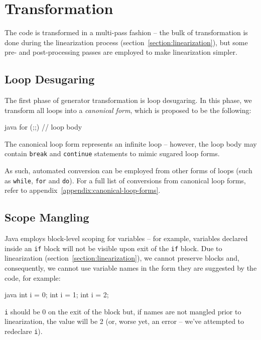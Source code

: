 \documentclass[journal,a4paper]{IEEEtran}
\begin{document}
\section{Transformation}

The code is transformed in a multi-pass fashion -- the bulk of transformation is done during the
linearization process (section~\ref{section:linearization}), but some pre- and post-processing
passes are employed to make linearization simpler.

\subsection{Loop Desugaring}

The first phase of generator transformation is loop desugaring. In this phase, we transform all
loops into a \emph{canonical form}, which is proposed to be the following:

\begin{pygmented}{java}
for (;;) {
    // loop body
}
\end{pygmented}

The canonical loop form represents an infinite loop -- however, the loop body may contain
\texttt{break} and \texttt{continue} statements to mimic sugared loop forms.

As such, automated conversion can be employed from other forms of loops (such as \texttt{while},
\texttt{for} and \texttt{do}). For a full list of conversions from canonical loop forms, refer to
appendix~\ref{appendix:canonical-loop-forms}.

\subsection{Scope Mangling}

Java employs block-level scoping for variables -- for example, variables declared inside an
\texttt{if} block will not be visible upon exit of the \texttt{if} block. Due to linearization
(section~\ref{section:linearization}), we cannot preserve blocks and, consequently, we cannot use
variable names in the form they are suggested by the code, for example:

\begin{pygmented}{java}
int i = 0;
{
    int i = 1;
    {
        int i = 2;
    }
}
\end{pygmented}

\texttt{i} should be 0 on the exit of the block but, if names are not mangled prior to
linearization, the value will be 2 (or, worse yet, an error -- we've attempted to redeclare
\texttt{i}).
\end{document}
